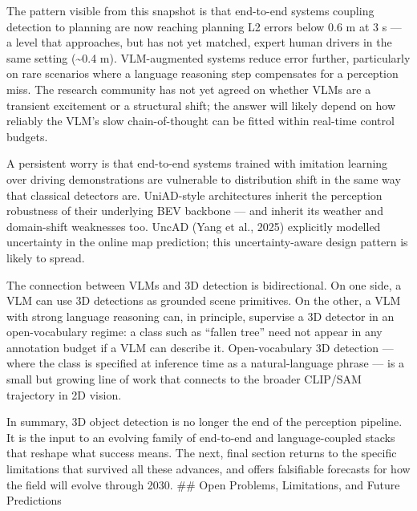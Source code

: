 The pattern visible from this snapshot is that end-to-end systems coupling detection to planning are now reaching planning L2 errors below 0.6 m at 3 s --- a level that approaches, but has not yet matched, expert human drivers in the same setting (\textasciitilde0.4 m). VLM-augmented systems reduce error further, particularly on rare scenarios where a language reasoning step compensates for a perception miss. The research community has not yet agreed on whether VLMs are a transient excitement or a structural shift; the answer will likely depend on how reliably the VLM's slow chain-of-thought can be fitted within real-time control budgets.

A persistent worry is that end-to-end systems trained with imitation learning over driving demonstrations are vulnerable to distribution shift in the same way that classical detectors are. UniAD-style architectures inherit the perception robustness of their underlying BEV backbone --- and inherit its weather and domain-shift weaknesses too. UncAD (Yang et al., 2025) explicitly modelled uncertainty in the online map prediction; this uncertainty-aware design pattern is likely to spread.

The connection between VLMs and 3D detection is bidirectional. On one side, a VLM can use 3D detections as grounded scene primitives. On the other, a VLM with strong language reasoning can, in principle, supervise a 3D detector in an open-vocabulary regime: a class such as ``fallen tree'' need not appear in any annotation budget if a VLM can describe it. Open-vocabulary 3D detection --- where the class is specified at inference time as a natural-language phrase --- is a small but growing line of work that connects to the broader CLIP/SAM trajectory in 2D vision.

In summary, 3D object detection is no longer the end of the perception pipeline. It is the input to an evolving family of end-to-end and language-coupled stacks that reshape what success means. The next, final section returns to the specific limitations that survived all these advances, and offers falsifiable forecasts for how the field will evolve through 2030.
\#\# Open Problems, Limitations, and Future Predictions


